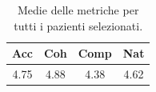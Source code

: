 
\begin{table}[!h]
\centering
\begin{tabular}{||c c c c||}
\hline
Acc & Coh & Comp & Nat \\ [0.5ex]
\hline\hline
4.75 & 4.88 & 4.38 & 4.62 \\
\hline
\end{tabular}
\caption{Medie delle metriche per tutti i pazienti selezionati.}
\label{tab:metriche_finali_pazienti}
\end{table}
